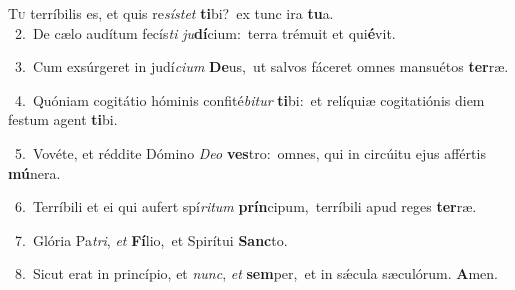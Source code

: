 \lettrine{\initial\textcolor{\initialcolor}{T}}{u} terríbilis es, et quis re\-\textit{sís}\-\textit{tet} \textbf{ti}\-bi?~\star ex tunc ira \textbf{tu}\-a.\\
{\numbfont\textcolor{\numbcolor}{~2.}}~De cælo audítum fecís\textit{ti} \textit{ju}\-\textbf{dí}cium:~\star terra trémuit et qui\-\textbf{é}\-vit.\par
{\numbfont\textcolor{\numbcolor}{~3.}}~Cum exsúrgeret in judí\-\textit{ci}\-\textit{um} \textbf{De}\-us,~\star ut salvos fáceret omnes mansuétos \textbf{ter}\-ræ.\par
{\numbfont\textcolor{\numbcolor}{~4.}}~Quóniam cogitátio hóminis confité\-\textit{bi}\-\textit{tur} \textbf{ti}\-bi:~\star et relíquiæ cogitatiónis diem festum agent \textbf{ti}\-bi.\par
{\numbfont\textcolor{\numbcolor}{~5.}}~Vovéte, et réddite Dómino \textit{De}\-\textit{o} \textbf{ves}\-tro:~\star omnes, qui in circúitu ejus affértis \textbf{mú}\-nera.\par
{\numbfont\textcolor{\numbcolor}{~6.}}~Terríbili et ei qui aufert spí\-\textit{ri}\-\textit{tum} \textbf{prín}\-cipum,~\star terríbili apud reges \textbf{ter}\-ræ.\par
{\numbfont\textcolor{\numbcolor}{~7.}}~Glória Pa\-\textit{tri}\-, \textit{et} \textbf{Fí}\-lio,~\star et Spirítui \textbf{Sanc}\-to.\par
{\numbfont\textcolor{\numbcolor}{~8.}}~Sicut erat in princípio, et \textit{nunc}\-, \textit{et} \textbf{sem}\-per,~\star et in sǽcula sæculórum. \textbf{A}\-men.\par
